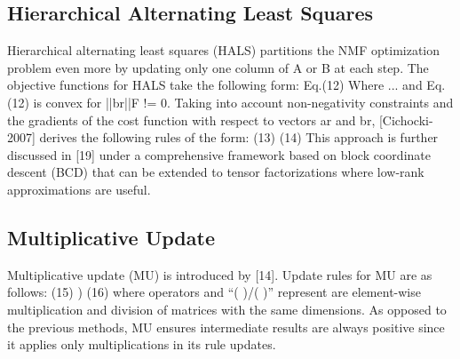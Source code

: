 \subsection{Hierarchical Alternating Least Squares}
Hierarchical alternating least squares (HALS) partitions the NMF optimization problem even more by updating only one column of A or B at each step.  The objective functions for HALS take the following form:
Eq.(12)
Where ... and Eq. (12) is convex for ||br||F != 0.  Taking into account non-negativity constraints and the gradients of the cost function with respect to vectors ar and br, [Cichocki-2007] derives the following rules of the form:
(13)
(14)
This approach is further discussed in [19] under a comprehensive framework based on block coordinate descent (BCD) that can be extended to tensor factorizations where low-rank approximations are useful.

\subsection{Multiplicative Update}
Multiplicative update (MU) is introduced by [14].   Update rules for MU are as follows:
(15)
)	(16)
where operators  and “(         )/(      )” represent are element-wise multiplication and division of matrices with the same dimensions.
As opposed to the previous methods, MU ensures intermediate results are always positive since it applies only multiplications in its rule updates.

